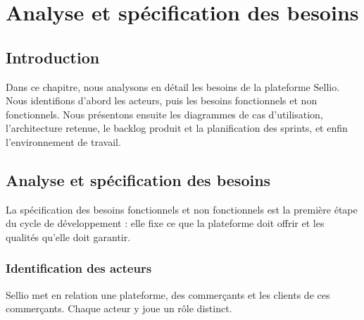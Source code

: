 \thispagestyle{fancy}
\chapter{Analyse et spécification des besoins}
\section*{Introduction}
Dans ce chapitre, nous analysons en détail les besoins de la plateforme Sellio. Nous identifions d'abord les acteurs, puis les besoins fonctionnels et non fonctionnels. Nous présentons ensuite les diagrammes de cas d'utilisation, l'architecture retenue, le backlog produit et la planification des sprints, et enfin l'environnement de travail.

\section{Analyse et spécification des besoins}
La spécification des besoins fonctionnels et non fonctionnels est la première étape du cycle de développement : elle fixe ce que la plateforme doit offrir et les qualités qu'elle doit garantir.

\subsection{Identification des acteurs}
Sellio met en relation une plateforme, des commerçants et les clients de ces commerçants. Chaque acteur y joue un rôle distinct.
